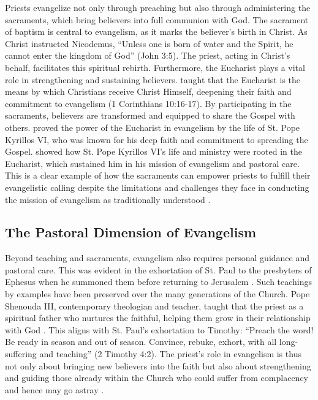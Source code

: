 \documentclass[12pt,doc]{apa7}   	%
\begin{document}
Priests evangelize not only through preaching but also through administering the sacraments, which bring believers into full communion with God. The sacrament of baptism is central to evangelism, as it marks the believer’s birth in Christ. As Christ instructed Nicodemus, “Unless one is born of water and the Spirit, he cannot enter the kingdom of God” (John 3:5). The priest, acting in Christ’s behalf, facilitates this spiritual rebirth.  Furthermore, the Eucharist plays a vital role in strengthening and sustaining believers. \citet{st_basil_letters} taught that the Eucharist is the means by which Christians receive Christ Himself, deepening their faith and commitment to evangelism (1 Corinthians 10:16-17). By participating in the sacraments, believers are transformed and equipped to share the Gospel with others.  \citet{fanous_silent_patriarch} proved the power of the Eucharist in evangelism by the life of St. Pope Kyrillos VI, who was known for his deep faith and commitment to spreading the Gospel.  \citeauthor{fanous_silent_patriarch} showed how St. Pope Kyrillos VI’s life and ministry were rooted in the Eucharist, which sustained him in his mission of evangelism and pastoral care.  This is a clear example of how the sacraments can empower priests to fulfill their evangelistic calling despite the limitations and challenges they face in conducting the mission of evangelism as traditionally understood \citep{holmes_apostolic_fathers}.

\subsection{The Pastoral Dimension of Evangelism}

Beyond teaching and sacraments, evangelism also requires personal guidance and pastoral care.  This was evident in the exhortation of St. Paul to the presbyters of Ephesus when he summoned them before returning to Jerusalem \citep{paul_wright}.  Such teachings by examples have been preserved over the many generations of the Church. Pope Shenouda III, contemporary theologian and teacher, taught that the priest as a spiritual father who nurtures the faithful, helping them grow in their relationship with God \citep{priesthood_shenouda}. This aligns with St. Paul’s exhortation to Timothy: “Preach the word! Be ready in season and out of season. Convince, rebuke, exhort, with all long-suffering and teaching” (2 Timothy 4:2). The priest’s role in evangelism is thus not only about bringing new believers into the faith but also about strengthening and guiding those already within the Church who could suffer from complacency and hence may go astray \citep{bebawi_pope_kyrillos}.
\end{document}
